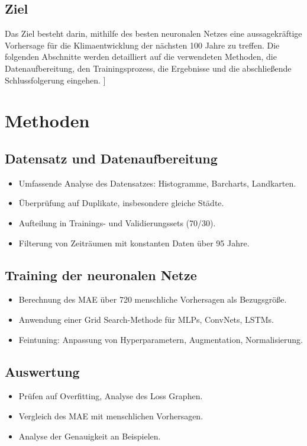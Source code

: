 \documentclass[manuscript,screen,review]{acmart} %
\begin{document}
\subsection{Ziel}
Das Ziel besteht darin, mithilfe des besten neuronalen Netzes eine aussagekräftige Vorhersage für die Klimaentwicklung der nächsten 100 Jahre zu treffen.
Die folgenden Abschnitte werden detailliert auf die verwendeten Methoden, die Datenaufbereitung, den Trainingsprozess, die Ergebnisse und die abschließende Schlussfolgerung eingehen.
]


\section{Methoden}

\subsection*{Datensatz und Datenaufbereitung}
\begin{itemize}
    \item Umfassende Analyse des Datensatzes: Histogramme, Barcharts, Landkarten.
    \item Überprüfung auf Duplikate, insbesondere gleiche Städte.
    \item Aufteilung in Trainings- und Validierungssets (70/30).
    \item Filterung von Zeiträumen mit konstanten Daten über 95 Jahre.
\end{itemize}

\subsection*{Training der neuronalen Netze}
\begin{itemize}
    \item Berechnung des MAE über 720 menschliche Vorhersagen als Bezugsgröße.
    \item Anwendung einer Grid Search-Methode für MLPs, ConvNets, LSTMs.
    \item Feintuning: Anpassung von Hyperparametern, Augmentation, Normalisierung.
\end{itemize}

\subsection*{Auswertung}
\begin{itemize}
    \item Prüfen auf Overfitting, Analyse des Loss Graphen.
    \item Vergleich des MAE mit menschlichen Vorhersagen.
    \item Analyse der Genauigkeit an Beispielen.
\end{itemize}
\end{document}

